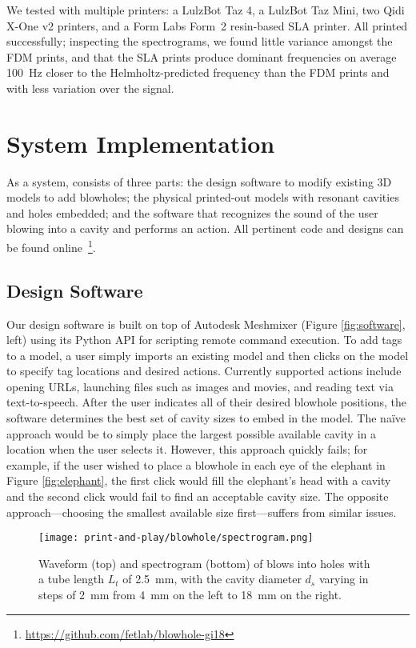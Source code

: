       We tested \bh with multiple printers: a LulzBot Taz 4, a LulzBot Taz Mini,
      two Qidi X-One v2 printers, and a Form Labs Form~2 resin-based SLA
      printer. All printed successfully; inspecting the spectrograms, we found
      little variance amongst the FDM prints, and that the SLA prints produce
      dominant frequencies on average 100~Hz closer to the Helmholtz-predicted
      frequency than the FDM prints and with less variation over the signal.

  \section{System Implementation}
    As a system, \bh consists of three parts: the design software to modify
    existing 3D models to add blowholes; the physical printed-out models with
    resonant cavities and holes embedded; and the software that recognizes the
    sound of the user blowing into a cavity and performs an action. All
    pertinent code and designs can be found
    online~\footnote{\url{https://github.com/fetlab/blowhole-gi18}}.
          
    \subsection{Design Software}
      Our design software is built on top of Autodesk Meshmixer (Figure
      \ref{fig:software}, left) using its Python API for scripting remote
      command execution. To add \bh tags to a model, a user simply imports an
      existing model and then clicks on the model to specify tag locations and
      desired actions. Currently supported actions include opening URLs,
      launching files such as images and movies, and reading text via
      text-to-speech. After the user indicates all of their desired blowhole
      positions, the software determines the best set of cavity sizes to embed
      in the model. The na\"ive approach would be to simply place the largest
      possible available cavity in a location when the user selects it. However,
      this approach quickly fails; for example, if the user wished to place a
      blowhole in each eye of the elephant in Figure \ref{fig:elephant}, the
      first click would fill the elephant's head with a cavity and the second
      click would fail to find an acceptable cavity size. The opposite
      approach---choosing the smallest available size first---suffers from
      similar issues. 
      
      \begin{figure*}[t]
        \centering
        \texttt{[image: print-and-play/blowhole/spectrogram.png]}
        \caption{Waveform (top) and spectrogram (bottom) of blows into holes with a tube length $L_t$ of 2.5~mm, with the cavity diameter $d_s$ varying in steps of 2~mm from 4~mm on the left to 18~mm on the right.}
        \label{fig:spectrogram}
      \end{figure*}

